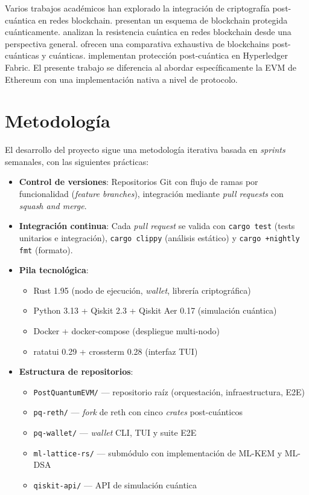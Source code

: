 Varios trabajos académicos han explorado la integración de criptografía post-cuántica en redes blockchain. \textcite{quantumsafeblockchain2018} presentan un esquema de blockchain protegida cuánticamente. \textcite{quantumresistance2023nature} analizan la resistencia cuántica en redes blockchain desde una perspectiva general. \textcite{surveycomparison2023} ofrecen una comparativa exhaustiva de blockchains post-cuánticas y cuánticas. \textcite{quantumsafefabric2024} implementan protección post-cuántica en Hyperledger Fabric. El presente trabajo se diferencia al abordar específicamente la EVM de Ethereum con una implementación nativa a nivel de protocolo.


\section{Metodología}

El desarrollo del proyecto sigue una metodología iterativa basada en \emph{sprints} semanales, con las siguientes prácticas:

\begin{itemize}
  \item \textbf{Control de versiones}: Repositorios Git con flujo de ramas por funcionalidad (\emph{feature branches}), integración mediante \emph{pull requests} con \emph{squash and merge}.
  
  \item \textbf{Integración continua}: Cada \emph{pull request} se valida con \texttt{cargo test} (tests unitarios e integración), \texttt{cargo clippy} (análisis estático) y \texttt{cargo +nightly fmt} (formato).
  
  \item \textbf{Pila tecnológica}:
  \begin{itemize}
    \item Rust 1.95 (nodo de ejecución, \emph{wallet}, librería criptográfica)
    \item Python 3.13 + Qiskit 2.3 + Qiskit Aer 0.17 (simulación cuántica)
    \item Docker + docker-compose (despliegue multi-nodo)
    \item ratatui 0.29 + crossterm 0.28 (interfaz TUI)
  \end{itemize}
  
  \item \textbf{Estructura de repositorios}:
  \begin{itemize}
    \item \texttt{PostQuantumEVM/} --- repositorio raíz (orquestación, infraestructura, E2E)
    \item \texttt{pq-reth/} --- \emph{fork} de reth con cinco \emph{crates} post-cuánticos
    \item \texttt{pq-wallet/} --- \emph{wallet} CLI, TUI y suite E2E
    \item \texttt{ml-lattice-rs/} --- submódulo con implementación de ML-KEM y ML-DSA
    \item \texttt{qiskit-api/} --- API de simulación cuántica
  \end{itemize}
\end{itemize}


